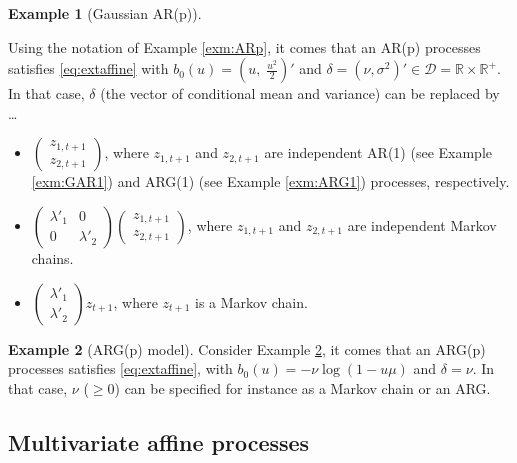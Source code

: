 \documentclass[
  12pt,
]{book}
\providecommand{\tightlist}{%
  \setlength{\itemsep}{0pt}\setlength{\parskip}{0pt}}
\theoremstyle{definition}
\theoremstyle{definition}
\newtheorem{example}{Example}[chapter]
\theoremstyle{definition}
\theoremstyle{definition}
\theoremstyle{remark}
\begin{document}
\begin{example}[Gaussian AR(p)]
\protect\hypertarget{exm:extendedARp}{}\label{exm:extendedARp}

Using the notation of Example \ref{exm:ARp}, it comes that an AR(p) processes satisfies \eqref{eq:extaffine} with \(b_0(u) = \left(u, \; \frac{u^2}{2}\right)'\) and \(\delta = (\nu,\sigma^2)' \in \mathcal{D}=\mathbb{R} \times \mathbb{R}^+\). In that case, \(\delta\) (the vector of conditional mean and variance) can be replaced by \ldots{}

\begin{itemize}
\tightlist
\item
  \(\left( \begin{array}{l} z_{1,t+1} \\ z_{2,t+1} \end{array} \right)\), where \(z_{1,t+1}\) and \(z_{2,t+1}\) are independent AR(1) (see Example \ref{exm:GAR1}) and ARG(1) (see Example \ref{exm:ARG1}) processes, respectively.
\item
  \(\left( \begin{array}{ll} \lambda'_1 & 0 \\ 0 & \lambda'_2 \end{array} \right)\)\(\left( \begin{array}{l} z_{1,t+1} \\ z_{2,t+1} \end{array} \right)\), where \(z_{1,t+1}\) and \(z_{2,t+1}\) are independent Markov chains.
\item
  \(\left( \begin{array}{l} \lambda'_1 \\ \lambda'_2 \end{array}\right)z_{t+1}\), where \(z_{t+1}\) is a Markov chain.
\end{itemize}

\end{example}

\begin{example}[ARG(p) model]
\protect\hypertarget{exm:ARGp}{}\label{exm:ARGp}Consider Example \ref{exm:ARGp}, it comes that an ARG(p) processes satisfies \eqref{eq:extaffine}, with \(b_0(u) = - \nu \log(1-u\mu)\) and \(\delta=\nu\). In that case, \(\nu\) (\(\ge 0\)) can be specified for instance as a Markov chain or an ARG.
\end{example}

\hypertarget{buildingmulti}{%
\subsection{Multivariate affine processes}\label{buildingmulti}}
\end{document}

